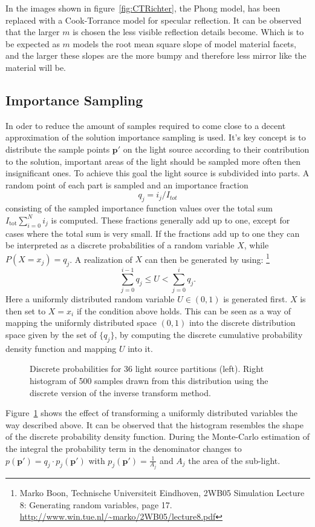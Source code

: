 In the images shown in figure~\ref*{fig:CTRichter}, the Phong model, has been replaced with a Cook-Torrance model for specular reflection. It can be observed that the larger $m$ is chosen the less visible reflection details become. Which is to be expected as $m$ models the root mean square slope of model material facets, and the larger these slopes are the more bumpy and therefore less mirror like the material will be.

\subsection{Importance Sampling}
In oder to  reduce the amount of samples required to come close to a decent approximation of the solution importance sampling is used. It's key concept is to distribute the sample points $\mathbf{p}'$ on the light source according to their contribution to the solution, important areas of the light should be sampled more often then insignificant ones. To achieve this goal the light source is subdivided into parts. A random point of each part is sampled and an importance fraction
\begin{equation}
q_j = i_j/I_{tot}
\end{equation}
consisting of the sampled importance function values over the total sum $I_{\text{tot}}\sum\limits_{i=0}^{N} i_j$ is computed. These fractions generally add up to one, except for cases where the total sum is very small. If the fractions add up to one they can be interpreted as a discrete probabilities of a random variable $X$, while $P(X = x_j) = q_j$. A realization of $X$ can then be generated by using:  \footnote{Marko Boon, Technische Universiteit Eindhoven, 2WB05 Simulation Lecture 8: Generating random variables, page 17. \url{http://www.win.tue.nl/~marko/2WB05/lecture8.pdf}}
\begin{equation}
\sum\limits_{j=0}^{i-1} q_j \leq U < \sum\limits_{j=0}^{i} q_j.
\end{equation} 
Here a uniformly distributed random variable $U \in (0,1)$ is generated first. $X$ is then set to $X = x_i$ if the condition above holds. This can be seen as a way of mapping the uniformly distributed space $(0,1)$ into the discrete distribution space given by the set of $\{q_j\}$, by computing the discrete cumulative probability density function and mapping $U$ into it.  
\begin{figure}
\centering


\caption{Discrete probabilities for 36 light source partitions (left). Right histogram of 500 samples drawn from this distribution using the discrete version of the inverse transform method.  }
\label{fig:invTrans}
\end{figure}
Figure~\ref{fig:invTrans} shows the effect of transforming a uniformly distributed variables the way described above. It can be observed that the histogram resembles the shape of the discrete probability density function. During the Monte-Carlo estimation of the integral the probability term in the denominator changes to $p(\mathbf{p}') = q_j \cdot p_j(\mathbf{p}')$ with $p_j(\mathbf{p}') = \frac{1}{A_j}$ and $A_j$ the area of the sub-light.

